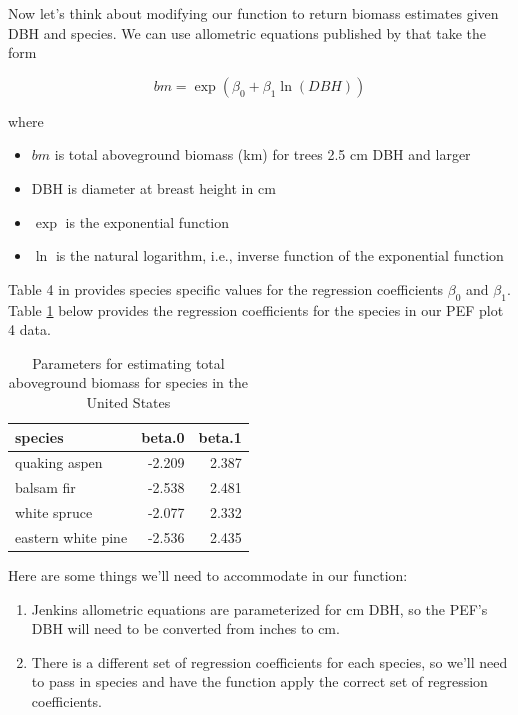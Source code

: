 \documentclass[]{krantz}
\providecommand{\tightlist}{%
  \setlength{\itemsep}{0pt}\setlength{\parskip}{0pt}}
\theoremstyle{definition}
\theoremstyle{definition}
\theoremstyle{definition}
\theoremstyle{remark}
\begin{document}
Now let's think about modifying our function to return biomass estimates
given DBH and species. We can use allometric equations published by
\citet{jenkins03} that take the form

\begin{equation}
  bm = \exp(\beta_0 + \beta_1 \ln(DBH))
  \label{eq:jenkBio}
\end{equation}

where

\begin{itemize}
\tightlist
\item
  \(bm\) is total aboveground biomass (km) for trees 2.5 cm DBH and
  larger
\item
  DBH is diameter at breast height in cm
\item
  \(\exp\) is the exponential function
\item
  \(\ln\) is the natural logarithm, i.e., inverse function of the
  exponential function
\end{itemize}

Table 4 in \citet{jenkins03} provides species specific values for the
regression coefficients \(\beta_0\) and \(\beta_1\). Table
\ref{tab:jenks} below provides the regression coefficients for the
species in our PEF plot 4 data.

\begin{table}

\caption{\label{tab:jenks}Parameters for estimating total aboveground biomass for species in the United States}
\centering
\begin{tabular}[t]{lrr}
\toprule
species & beta.0 & beta.1\\
\midrule
quaking aspen & -2.209 & 2.387\\
balsam fir & -2.538 & 2.481\\
white spruce & -2.077 & 2.332\\
eastern white pine & -2.536 & 2.435\\
\bottomrule
\end{tabular}
\end{table}

Here are some things we'll need to accommodate in our function:

\begin{enumerate}
\def\labelenumi{\arabic{enumi}.}
\tightlist
\item
  Jenkins allometric equations are parameterized for cm DBH, so the
  PEF's DBH will need to be converted from inches to cm.
\item
  There is a different set of regression coefficients for each species,
  so we'll need to pass in species and have the function apply the
  correct set of regression coefficients.
\end{enumerate}
\end{document}
